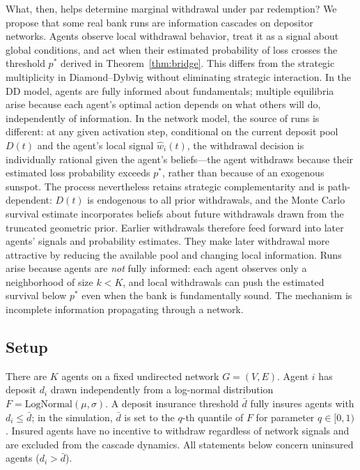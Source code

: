\documentclass[12pt]{article}\usepackage[]{graphicx}\usepackage[]{xcolor}
\begin{document}
What, then, helps determine marginal withdrawal under par redemption?
We propose that some real bank runs are information cascades on depositor networks.
Agents observe local withdrawal behavior, treat it as a signal about global conditions, and act when their estimated probability of loss crosses the threshold $p^*$ derived in Theorem~\ref{thm:bridge}.
This differs from the strategic multiplicity in Diamond--Dybvig without eliminating strategic interaction.
In the DD model, agents are fully informed about fundamentals; multiple equilibria arise because each agent's optimal action depends on what others will do, independently of information.
In the network model, the source of runs is different: at any given activation step, conditional on the current deposit pool $D(t)$ and the agent's local signal $\hat{w}_i(t)$, the withdrawal decision is individually rational given the agent's beliefs---the agent withdraws because their estimated loss probability exceeds $p^*$, rather than because of an exogenous sunspot.
The process nevertheless retains strategic complementarity and is path-dependent: $D(t)$ is endogenous to all prior withdrawals, and the Monte Carlo survival estimate incorporates beliefs about future withdrawals drawn from the truncated geometric prior.
Earlier withdrawals therefore feed forward into later agents' signals and probability estimates.
They make later withdrawal more attractive by reducing the available pool and changing local information.
Runs arise because agents are \emph{not} fully informed: each agent observes only a neighborhood of size $k < K$, and local withdrawals can push the estimated survival below $p^*$ even when the bank is fundamentally sound.
The mechanism is incomplete information propagating through a network.
\subsection{Setup}
\label{sec:setup}

There are $K$ agents on a fixed undirected network $G = (V, E)$.
Agent $i$ has deposit $d_i$ drawn independently from a log-normal distribution $F = \mathrm{LogNormal}(\mu, \sigma)$.
A deposit insurance threshold $\bar{d}$ fully insures agents with $d_i \leq \bar{d}$; in the simulation, $\bar{d}$ is set to the $q$-th quantile of $F$ for parameter $q \in [0,1)$.
Insured agents have no incentive to withdraw regardless of network signals and are excluded from the cascade dynamics.
All statements below concern uninsured agents ($d_i > \bar{d}$).
\end{document}
